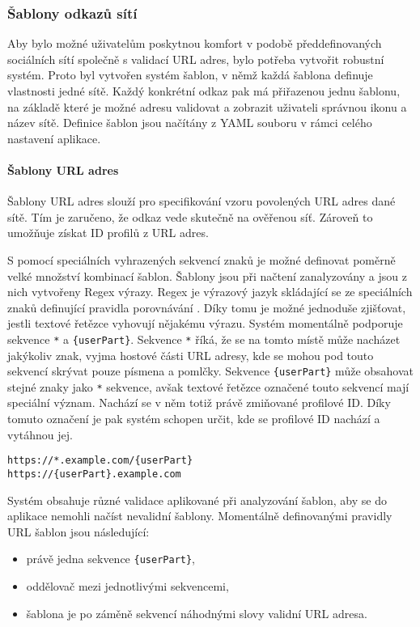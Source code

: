 		\subsubsection{Šablony odkazů sítí}

		Aby bylo možné uživatelům poskytnou komfort v podobě předdefinovaných sociálních sítí společně s validací \ac{URL} adres,
		bylo potřeba vytvořit robustní systém.
		Proto byl vytvořen systém šablon, v němž každá šablona definuje vlastnosti jedné sítě.
		Každý konkrétní odkaz pak má přiřazenou jednu šablonu, na základě které je možné adresu validovat a
		zobrazit uživateli správnou ikonu a název sítě.
		Definice šablon jsou načítány z \ac{YAML} souboru v rámci celého nastavení aplikace.

			\paragraph{Šablony URL adres}

			Šablony \ac{URL} adres slouží pro specifikování vzoru povolených \ac{URL} adres dané sítě.
			Tím je zaručeno, že odkaz vede skutečně na ověřenou síť.
			Zároveň to umožňuje získat ID profilů z \ac{URL} adres.

			S pomocí speciálních vyhrazených sekvencí znaků je možné definovat poměrně velké množství kombinací
			šablon.
			Šablony jsou při načtení zanalyzovány a jsou z nich vytvořeny Regex výrazy.
			Regex je výrazový jazyk skládající se ze speciálních znaků definující pravidla porovnávání \cite{regex}.
			Díky tomu je možné jednoduše zjišťovat, jestli textové řetězce vyhovují nějakému výrazu.
			Systém momentálně podporuje sekvence \lstinline{*} a \lstinline!{userPart}!.
			Sekvence \lstinline{*} říká, že se na tomto místě může nacházet jakýkoliv znak, vyjma hostové části \ac{URL}
			adresy, kde se mohou pod touto sekvencí skrývat pouze písmena a pomlčky.
			Sekvence \lstinline!{userPart}! může obsahovat stejné znaky jako \lstinline{*} sekvence, avšak textové
			řetězce označené touto sekvencí mají speciální význam.
			Nachází se v něm totiž právě zmiňované profilové ID.
			Díky tomuto označení je pak systém schopen určit, kde se profilové ID nachází a vytáhnou jej.

			\begin{lstlisting}[caption={Ukázka šablon URL adres. Zdroj: [autor]}]
https://*.example.com/{userPart}
https://{userPart}.example.com
			\end{lstlisting}

			Systém obsahuje různé validace aplikované při analyzování šablon, aby se do aplikace nemohli načíst
			nevalidní šablony.
			Momentálně definovanými pravidly URL šablon jsou následující:
			\begin{itemize}
				\item právě jedna sekvence \lstinline!{userPart}!,
				\item oddělovač mezi jednotlivými sekvencemi,
				\item šablona je po záměně sekvencí náhodnými slovy validní \ac{URL} adresa.
			\end{itemize}

